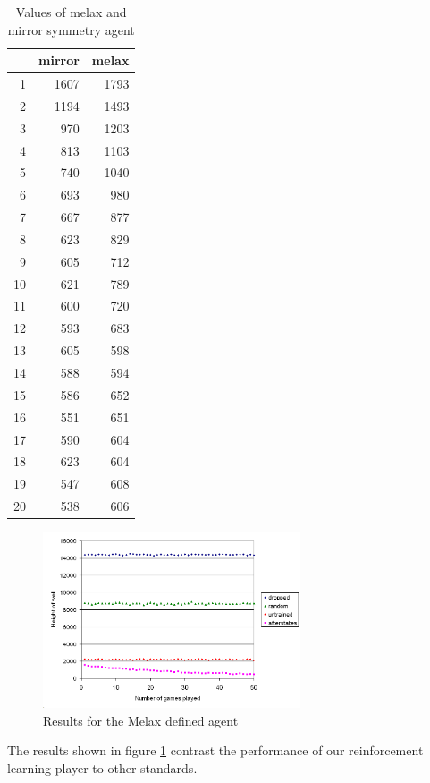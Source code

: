 \documentclass{rucsthesis}
\begin{document}
\begin{table}[h]
\centering
\begin{tabular}{|r|r|r|}
\hline
	&	mirror	&	melax \\	
\hline
1	&	1607	&	1793	\\
\hline
2	&	1194	&	1493	\\
\hline
3	&	970	&	1203	\\
\hline
4	&	813	&	1103	\\
\hline
5	&	740	&	1040	\\
\hline
6	&	693	&	980	\\
\hline
7	&	667	&	877	\\
\hline
8	&	623	&	829	\\
\hline
9	&	605	&	712	\\
\hline
10	&	621	&	789	\\
\hline
11	&	600	&	720	\\
\hline
12	&	593	&	683	\\
\hline
13	&	605	&	598	\\
\hline
14	&	588	&	594	\\
\hline
15	&	586	&	652	\\
\hline
16	&	551	&	651	\\
\hline
17	&	590	&	604	\\
\hline
18	&	623	&	604	\\
\hline
19	&	547	&	608	\\
\hline
20	&	538	&	606	\\
\hline
\end{tabular}
\caption{Values of melax and mirror symmetry agent}
\end{table}

\begin{figure}[h]
\centering
\includegraphics[width=3in]{mymelaxresults.png}
\caption{Results for the Melax defined agent}
\label{fig:mymelaxresults}
\end{figure}

The results shown in figure \ref{fig:mymelaxresults} contrast the performance of our reinforcement learning player to other standards. 
\end{document}
